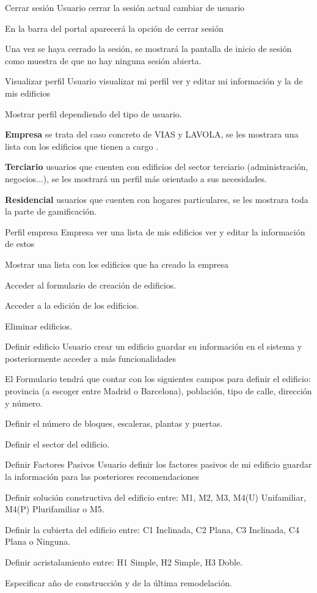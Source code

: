 \historiaDeUsuario
{Cerrar sesión}
{Usuario}
{cerrar la sesión actual}
{cambiar de usuario}
{
    \item En la barra del portal aparecerá la opción de cerrar sesión
    \item Una vez se haya cerrado la sesión, se mostrará la pantalla de inicio de sesión como muestra de que no hay ninguna sesión abierta.
}

\historiaDeUsuario
{Visualizar perfil}
{Usuario}
{visualizar mi perfil}
{ver y editar mi información y la de mis edificios}
{
    \item Mostrar perfil dependiendo del tipo de usuario.
    \item \textbf{Empresa} se trata del caso concreto de VIAS y LAVOLA, se les mostrara una lista con los edificios que tienen a cargo .
    \item \textbf{Terciario} usuarios que cuenten con edificios del sector terciario (administración, negocios...), se les mostrará un perfil más orientado a sus necesidades.
    \item \textbf{Residencial} usuarios que cuenten con hogares particulares, se les mostrara toda la parte de gamificación.
}

\historiaDeUsuario
{Perfil empresa}
{Empresa}
{ver una lista de mis edificios}
{ver y editar la información de estos}
{
    \item Mostrar una lista con los edificios que ha creado la empresa
    \item Acceder al formulario de creación de edificios.
    \item Acceder a la edición de los edificios.
    \item Eliminar edificios.
}

\historiaDeUsuario
{Definir edificio}
{Usuario}
{crear un edificio}
{guardar su información en el sistema y posteriormente acceder a más funcionalidades}
{
    \item El Formulario tendrá que contar con los siguientes campos para definir el edificio: provincia (a escoger entre Madrid o Barcelona), población, tipo de calle, dirección y número. 
    \item Definir el número de bloques, escaleras, plantas y puertas.
    \item Definir el sector del edificio.
}

\historiaDeUsuario
{Definir Factores Pasivos}
{Usuario}
{definir los factores pasivos de mi edificio}
{guardar la información para las posteriores recomendaciones}
{
    \item Definir solución constructiva del edificio entre: M1, M2, M3, M4(U) Unifamiliar, M4(P) Plurifamiliar o M5.
    \item Definir la cubierta del edificio entre: C1 Inclinada, C2 Plana, C3 Inclinada, C4 Plana o Ninguna.
    \item Definir acristalamiento entre: H1 Simple, H2 Simple, H3 Doble.
    \item Especificar año de construcción y de la última remodelación.
}

